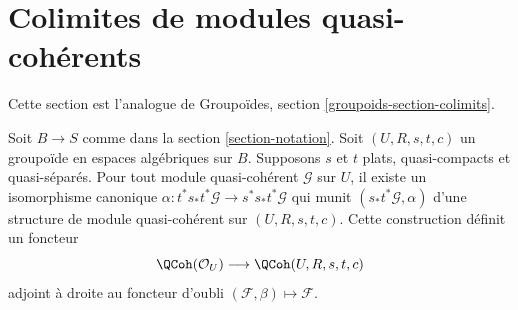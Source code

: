 \section{Colimites de modules quasi-cohérents}
\label{section-colimits}

\noindent
Cette section est l'analogue de Groupoïdes, section \ref{groupoids-section-colimits}.

\begin{lemma}
\label{lemma-construct-quasi-coherent}
Soit $B \to S$ comme dans la section \ref{section-notation}. Soit $(U, R, s, t, c)$ un groupoïde en espaces algébriques sur $B$. Supposons $s$ et $t$ plats, quasi-compacts et quasi-séparés. Pour tout module quasi-cohérent $\mathcal{G}$ sur $U$, il existe un isomorphisme canonique $\alpha : t^*s_*t^*\mathcal{G} \to s^*s_*t^*\mathcal{G}$ qui munit $(s_*t^*\mathcal{G}, \alpha)$ d'une structure de module quasi-cohérent sur $(U, R, s, t, c)$. Cette construction définit un foncteur
$$
\QCoh(\mathcal{O}_U) \longrightarrow \QCoh(U, R, s, t, c)
$$
adjoint à droite au foncteur d'oubli $(\mathcal{F}, \beta) \mapsto \mathcal{F}$.
\end{lemma}

